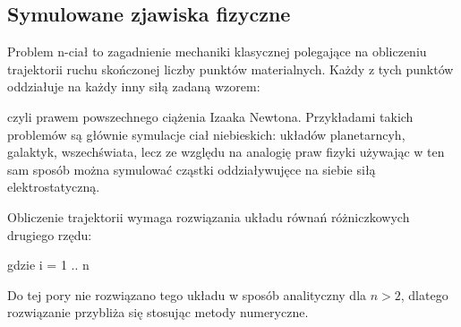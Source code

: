 

\subsection {Symulowane zjawiska fizyczne}
Problem n-ciał to zagadnienie mechaniki klasycznej polegające na obliczeniu trajektorii ruchu skończonej liczby punktów materialnych. 
Każdy z tych punktów oddziałuje na każdy inny siłą zadaną wzorem:

\begin{center}
 
\end{center}

czyli prawem powszechnego ciążenia Izaaka Newtona.\linebreak
Przykładami takich problemów są głównie symulacje ciał niebieskich: układów planetarncyh, galaktyk, wszechświata, lecz ze względu na analogię praw fizyki używając w ten sam sposób można symulować cząstki oddziaływujęce na siebie siłą elektrostatyczną.\linebreak

Obliczenie trajektorii wymaga rozwiązania układu równań różniczkowych drugiego rzędu:
\begin{center}
 gdzie i = 1 .. n 
\end{center}


Do tej pory nie rozwiązano tego układu w sposób analityczny dla $n > 2$, dlatego rozwiązanie przybliża się stosując metody numeryczne. 